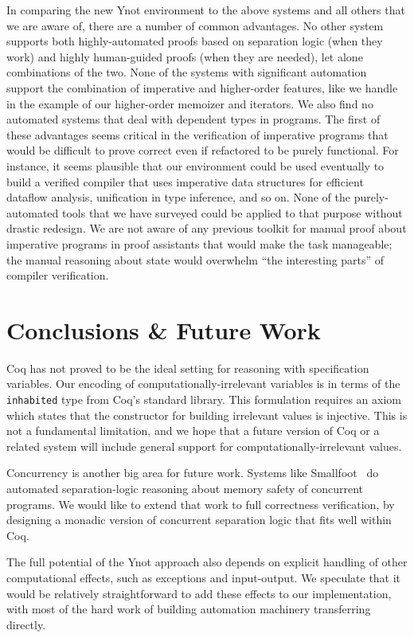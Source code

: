 \documentclass[preprint,nocopyrightspace]{sigplanconf}
\newcommand{\cd}[1]{\texttt{#1}}
\begin{document}
{In comparing the new Ynot environment to the above systems and all others that we are aware of, there are a number of common advantages.  No other system supports both highly-automated proofs based on separation logic (when they work) and highly human-guided proofs (when they are needed), let alone combinations of the two.  None of the systems with significant automation support the combination of imperative and higher-order features, like we handle in the example of our higher-order memoizer and iterators.  We also find no automated systems that deal with dependent types in programs.  The first of these advantages seems critical in the verification of imperative programs that would be difficult to prove correct even if refactored to be purely functional.  For instance, it seems plausible that our environment could be used eventually to build a verified compiler that uses imperative data structures for efficient dataflow analysis, unification in type inference, and so on.  None of the purely-automated tools that we have surveyed could be applied to that purpose without drastic redesign.  We are not aware of any previous toolkit for manual proof about imperative programs in proof assistants that would make the task manageable; the manual reasoning about state would overwhelm ``the interesting parts'' of compiler verification.


\section{Conclusions \& Future Work}

Coq has not proved to be the ideal setting for reasoning with specification variables.  Our encoding of computationally-irrelevant variables is in terms of the \cd{inhabited} type from Coq's standard library. This formulation requires an axiom which states that the constructor for building irrelevant values is injective.  This is not a fundamental limitation, and we hope that a future version of Coq or a related system will include general support for computationally-irrelevant values.

Concurrency is another big area for future work.  Systems like Smallfoot~\cite{smallfoot} do automated separation-logic reasoning about memory safety of concurrent programs.  We would like to extend that work to full correctness verification, by designing a monadic version of concurrent separation logic that fits well within Coq.

The full potential of the Ynot approach also depends on explicit handling of other computational effects, such as exceptions and input-output.  We speculate that it would be relatively straightforward to add these effects to our implementation, with most of the hard work of building automation machinery transferring directly.

}
\end{document}
